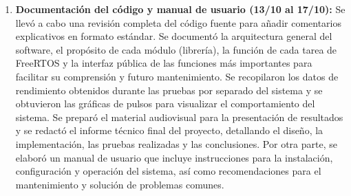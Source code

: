 \begin{enumerate}[label=\textbf{Semana \arabic*:}, leftmargin=*]
    \item \textbf{Documentación del código y manual de usuario (13/10 al 17/10):}
    Se llevó a cabo una revisión completa del código fuente para añadir comentarios explicativos en formato estándar. Se documentó la arquitectura general del software, el propósito de cada módulo (librería), la función de cada tarea de FreeRTOS y la interfaz pública de las funciones más importantes para facilitar su comprensión y futuro mantenimiento.
    Se recopilaron los datos de rendimiento obtenidos durante las pruebas por separado del sistema y se obtuvieron las gráficas de pulsos para visualizar el comportamiento del sistema. Se preparó el material audiovisual para la presentación de resultados y se redactó el informe técnico final del proyecto, detallando el diseño, la implementación, las pruebas realizadas y las conclusiones. Por otra parte, se elaboró un manual de usuario que incluye instrucciones para la instalación, configuración y operación del sistema, así como recomendaciones para el mantenimiento y solución de problemas comunes.

\end{enumerate}